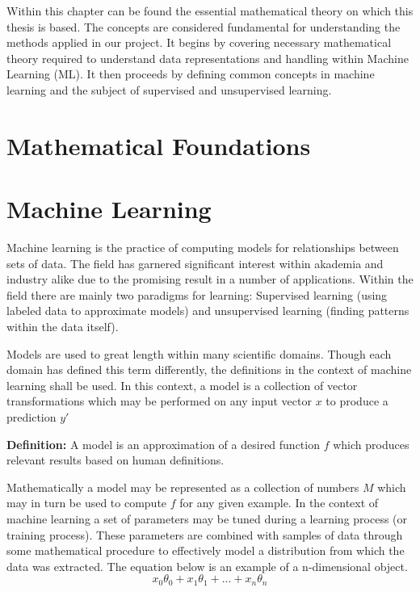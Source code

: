 Within this chapter can be found the essential mathematical theory on which this thesis is based. The concepts are considered fundamental for understanding the methods applied in our project. It begins by 
covering necessary mathematical theory required to understand data representations and handling within Machine Learning (ML). It then proceeds by defining common concepts in machine learning and the subject of supervised and unsupervised learning.


\section{Mathematical Foundations}

\section{Machine Learning}

Machine learning is the practice of computing models for relationships between sets of data. The field has garnered significant interest within akademia and industry alike due to the promising result in a number of applications. Within the field there are mainly two paradigms for learning: Supervised learning (using labeled data to approximate models) and unsupervised learning (finding patterns within the data itself). 

Models are used to great length within many scientific domains. Though each domain has defined this term differently, the definitions in the context of machine learning shall be used. In this context, a model is a collection of vector transformations which may be performed on any input vector $x$ to produce a prediction $y'$

\vspace{5mm}

\textbf{Definition: } A model is an approximation of a desired function $f$ which produces relevant results based on human definitions.  

\vspace{5mm}

Mathematically a model may be represented as a collection of numbers $M$ which may in turn be used to compute $f$ for any given example.
In the context of machine learning a set of parameters may be tuned during a learning process (or training process). These parameters are combined with samples of data through some mathematical procedure to effectively model a distribution from which the data was extracted. The equation below is an example of a n-dimensional object.
$$x_0\theta_0 + x_1\theta_1 + ... + x_n\theta_n$$

